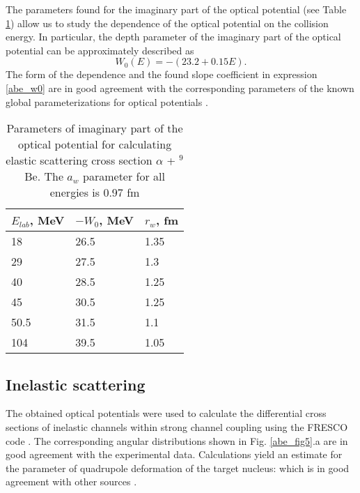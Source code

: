 \documentclass[
12pt, %
oneside, %
english, %
onehalfspacing, %
onehalfspacing, %
headsepline, %
]{MastersDoctoralThesis} %
\begin{document}
The parameters found for the imaginary part of the optical potential (see Table \ref{abe_tab1}) allow us to study the dependence of the optical potential on the collision energy. In particular, the depth parameter of the imaginary part of the optical potential can be approximately described as
\begin{equation}
W_0(E)=-(23.2+0.15E).
\label{abe_w0}
\end{equation}
The form of the dependence and the found slope coefficient in expression \ref{abe_w0} are in good agreement with the corresponding parameters of the known global parameterizations for optical potentials \cite{avrigeanu1994global}.


\begin{table}[bp]
\caption{
\footnotesize
Parameters of imaginary part of the optical potential for calculating elastic scattering cross section $\alpha$ + $^9$Be. The $a_w$ parameter for all energies is 0.97 fm
}
\label{abe_tab1}
\centering
\footnotesize
\begin{tabular}{lll}
\hline
$E_{lab}$, MeV & $-W_0$, MeV & $r_w$, fm \\ \hline
18             & 26.5        & 1.35      \\
29             & 27.5        & 1.3       \\
40             & 28.5        & 1.25      \\
45             & 30.5        & 1.25      \\
50.5           & 31.5        & 1.1       \\
104            & 39.5        & 1.05      \\ \hline
\end{tabular}
\end{table}

\subsection{Inelastic scattering}
The obtained optical potentials were used to calculate the differential cross sections of inelastic channels within strong channel coupling using the FRESCO code \cite{fresco}. 
The corresponding angular distributions shown in Fig. \ref{abe_fig5}.a are in good agreement with the experimental data. 
Calculations yield an estimate for the parameter of quadrupole deformation of the target
nucleus:   which is in good agreement with other sources \cite{harakeh1980strong, roy1995coupled, lukyanov2014study}.
\end{document}
